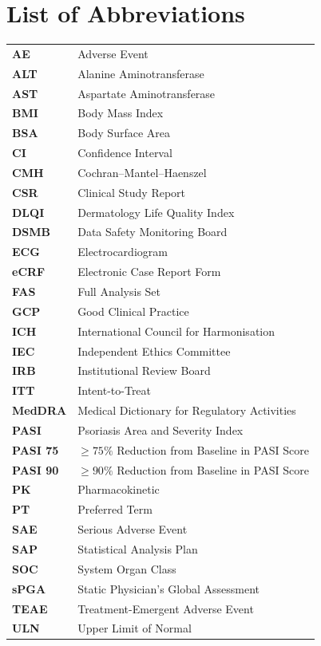 \section*{List of Abbreviations}

\renewcommand{\arraystretch}{1.15}
\begin{tabularx}{\linewidth}{@{}>{\bfseries}l@{\hspace{5mm}}X@{}}
AE        & Adverse Event \\
ALT       & Alanine Aminotransferase \\
AST       & Aspartate Aminotransferase \\
BMI       & Body Mass Index \\
BSA       & Body Surface Area \\
CI        & Confidence Interval \\
CMH       & Cochran--Mantel--Haenszel \\
CSR       & Clinical Study Report \\
DLQI      & Dermatology Life Quality Index \\
DSMB      & Data Safety Monitoring Board \\
ECG       & Electrocardiogram \\
eCRF      & Electronic Case Report Form \\
FAS       & Full Analysis Set \\
GCP       & Good Clinical Practice \\
ICH       & International Council for Harmonisation \\
IEC       & Independent Ethics Committee \\
IRB       & Institutional Review Board \\
ITT       & Intent-to-Treat \\
MedDRA    & Medical Dictionary for Regulatory Activities \\
PASI      & Psoriasis Area and Severity Index \\
PASI 75   & $\ge 75\%$ Reduction from Baseline in PASI Score \\
PASI 90   & $\ge 90\%$ Reduction from Baseline in PASI Score \\
PK        & Pharmacokinetic \\
PT        & Preferred Term \\
SAE       & Serious Adverse Event \\
SAP       & Statistical Analysis Plan \\
SOC       & System Organ Class \\
sPGA      & Static Physician's Global Assessment \\
TEAE      & Treatment-Emergent Adverse Event \\
ULN       & Upper Limit of Normal \\
\end{tabularx}
\renewcommand{\arraystretch}{1.0}

\newpage

